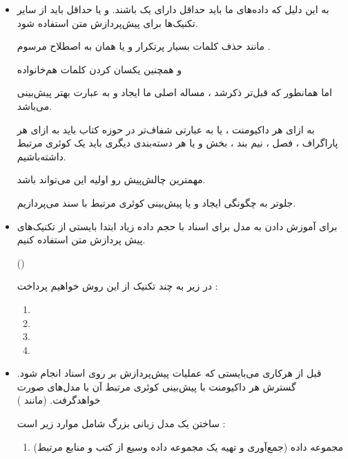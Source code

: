 \begin{boxC}
\begin{itemize}
    \item 
    به این دلیل که داده‌های ما باید حداقل دارای یک 
    باشند.
    و یا حداقل باید از سایر تکنیک‌ها برای پیش‌پردازش متن استفاده شود.

    مانند حذف کلمات بسیار پرتکرار و یا همان به اصطلاح مرسوم 
    .

    و همچنین یکسان کردن کلمات هم‌خانواده 

    اما همانطور که قبل‌تر ذکرشد ، مساله اصلی ما ایجاد و به عبارت بهتر پیش‌بینی 
    می‌باشد.

    به ازای هر داکیومنت ، یا به عبارتی شفاف‌تر در حوزه کتاب باید به ازای هر پاراگراف ، فصل ، نیم بند ، بخش و یا هر
    دسته‌بندی دیگری باید یک کوئری مرتبط داشته‌باشیم.

    مهمترین چالش‌پیش رو اولیه این می‌تواند باشد.

    جلوتر به چگونگی ایجاد و یا پیش‌بینی کوئری مرتبط با سند می‌پردازیم.



    \item 
    برای آموزش دادن به مدل برای اسناد با حجم داده زیاد ابتدا بایستی از تکنیک‌های پیش پردازش متن استفاده کنیم.
    
    ()

    در زیر به چند تکنیک از این روش خواهیم پرداخت :

    \begin{enumerate}
        \item 
        
        \item 

        \item 

        \item 
    \end{enumerate}


    \item 
    قبل از هرکاری می‌بایستی که عملیات پیش‌پردازش بر روی اسناد انجام شود.
    گسترش هر داکیومنت با پیش‌بینی کوئری مرتبط آن با مدل‌های 
    صورت خواهدگرفت.
    (مانند )
    
    ساختن یک مدل زبانی بزرگ شامل موارد زیر است :
    \begin{enumerate}
        \item 
        مجموعه داده (جمع‌آوری و تهیه یک مجموعه داده وسیع از کتب و منابع مرتبط)


\end{enumerate}
\end{itemize}
\end{boxC}
